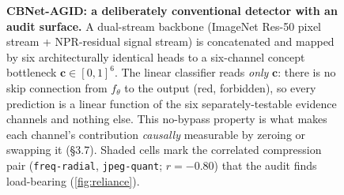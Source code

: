 \begin{figure}[t]
{}
  \caption{\textbf{CBNet-AGID: a deliberately conventional detector with an audit
    surface.} A dual-stream backbone (ImageNet Res-50 pixel stream + NPR-residual
    signal stream) is concatenated and mapped by six architecturally identical heads to a
    six-channel concept bottleneck $\mathbf{c}\in[0,1]^6$. The linear classifier reads
    \emph{only} $\mathbf{c}$: there is no skip connection from $f_\theta$ to the output
    (red, forbidden), so every prediction is a linear function of the six
    separately-testable evidence channels and nothing else. This no-bypass property is what
    makes each channel's contribution \emph{causally} measurable by zeroing or swapping it
    (\S{}3.7). Shaded cells mark the correlated compression pair
    (\texttt{freq-radial}, \texttt{jpeg-quant}; $r{=}{-}0.80$) that the audit finds
    load-bearing (\autoref{fig:reliance}).}
  \label{fig:arch}
\end{figure}
